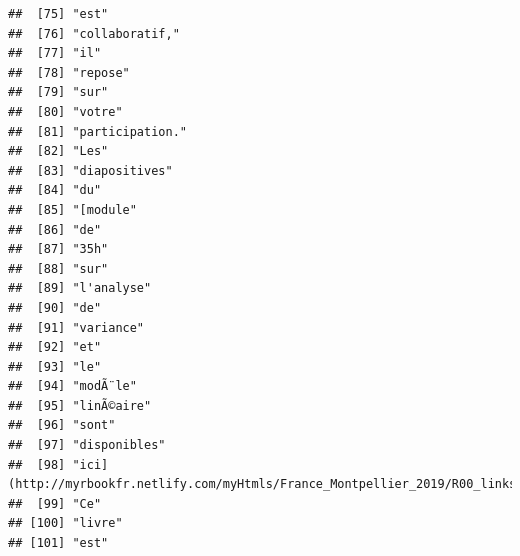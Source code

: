 \documentclass[]{book}
\begin{document}
\begin{verbatim}
##  [75] "est"                                                                                    
##  [76] "collaboratif,"                                                                          
##  [77] "il"                                                                                     
##  [78] "repose"                                                                                 
##  [79] "sur"                                                                                    
##  [80] "votre"                                                                                  
##  [81] "participation."                                                                         
##  [82] "Les"                                                                                    
##  [83] "diapositives"                                                                           
##  [84] "du"                                                                                     
##  [85] "[module"                                                                                
##  [86] "de"                                                                                     
##  [87] "35h"                                                                                    
##  [88] "sur"                                                                                    
##  [89] "l'analyse"                                                                              
##  [90] "de"                                                                                     
##  [91] "variance"                                                                               
##  [92] "et"                                                                                     
##  [93] "le"                                                                                     
##  [94] "modÃ¨le"                                                                                
##  [95] "linÃ©aire"                                                                              
##  [96] "sont"                                                                                   
##  [97] "disponibles"                                                                            
##  [98] "ici](http://myrbookfr.netlify.com/myHtmls/France_Montpellier_2019/R00_links.html)."     
##  [99] "Ce"                                                                                     
## [100] "livre"                                                                                  
## [101] "est"                                                                                    

\end{verbatim}
\end{document}
